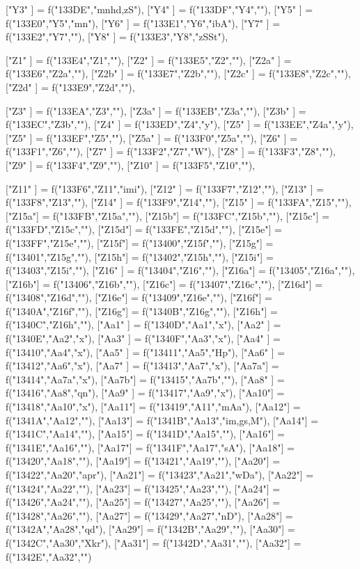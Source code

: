 {["Y3"  ]    = f("133DE","mnhd,zS"),
  ["Y4"  ]    = f("133DF","Y4",""),
["Y5"  ]    = f("133E0","Y5","mn"),
["Y6"  ]    = f("133E1","Y6","ibA"),
  ["Y7"  ]    = f("133E2","Y7",""),
["Y8"  ]    = f("133E3","Y8","zSSt"),

  ["Z1"  ]    = f("133E4","Z1",""),
  ["Z2"  ]    = f("133E5","Z2",""),
  ["Z2a" ]    = f("133E6","Z2a",""),
  ["Z2b" ]    = f("133E7","Z2b",""),
["Z2c" ]    = f("133E8","Z2c",""),
["Z2d" ]    = f("133E9","Z2d",""),

  ["Z3"  ]    = f("133EA","Z3",""),
  ["Z3a" ]    = f("133EB","Z3a",""),
["Z3b" ]    = f("133EC","Z3b",""),
["Z4"  ]    = f("133ED","Z4","y"),
["Z5"  ]    = f("133EE","Z4a","y"),
  ["Z5"  ]    = f("133EF","Z5",""),
  ["Z5a" ]    = f("133F0","Z5a",""),
  ["Z6"  ]    = f("133F1","Z6",""),
["Z7"  ]    = f("133F2","Z7","W"),
  ["Z8"  ]    = f("133F3","Z8",""),
  ["Z9"  ]    = f("133F4","Z9",""),
  ["Z10" ]    = f("133F5","Z10",""),

["Z11" ]    = f("133F6","Z11","imi"),
  ["Z12" ]    = f("133F7","Z12",""),
  ["Z13" ]    = f("133F8","Z13",""),
  ["Z14" ]    = f("133F9","Z14",""),
  ["Z15" ]    = f("133FA","Z15",""),
  ["Z15a"]    = f("133FB","Z15a",""),
  ["Z15b"]    = f("133FC","Z15b",""),
  ["Z15c"]    = f("133FD","Z15c",""),
  ["Z15d"]    = f("133FE","Z15d",""),
  ["Z15e"]    = f("133FF","Z15e",""),
  ["Z15f"]    = f("13400","Z15f",""),
  ["Z15g"]    = f("13401","Z15g",""),
  ["Z15h"]    = f("13402","Z15h",""),
["Z15i"]    = f("13403","Z15i",""),
  ["Z16" ]    = f("13404","Z16",""),
  ["Z16a"]    = f("13405","Z16a",""),
  ["Z16b"]    = f("13406","Z16b",""),
  ["Z16c"]    = f("13407","Z16c",""),
  ["Z16d"]    = f("13408","Z16d",""),
  ["Z16e"]    = f("13409","Z16e",""),
  ["Z16f"]    = f("1340A","Z16f",""),
  ["Z16g"]  = f("1340B","Z16g",""),
  ["Z16h"]  = f("1340C","Z16h",""),
["Aa1" ]  = f("1340D","Aa1","x"),
    ["Aa2" ]    = f("1340E","Aa2","x"),
["Aa3" ]    = f("1340F","Aa3","x"),
["Aa4" ]    = f("13410","Aa4","x"),
["Aa5" ]    = f("13411","Aa5","Hp"),
["Aa6" ]    = f("13412","Aa6","x"),
["Aa7" ]    = f("13413","Aa7","x"),
["Aa7a"]    = f("13414","Aa7a","x"),
["Aa7b"]    = f("13415","Aa7b",""),
["Aa8" ]    = f("13416","Aa8","qn"),
["Aa9" ]    = f("13417","Aa9","x"),
["Aa10"]    = f("13418","Aa10","x"),
["Aa11"]    = f("13419","A11","mAa"),
["Aa12"]    = f("1341A","Aa12",""),
["Aa13"]    = f("1341B","Aa13","im,gs,M"),
["Aa14"]    = f("1341C","Aa14",""),
["Aa15"]    = f("1341D","Aa15",""),
["Aa16"]    = f("1341E","Aa16",""),
["Aa17"]    = f("1341F","Aa17","sA"),
["Aa18"]    = f("13420","Aa18",""),
["Aa19"]    = f("13421","Aa19",""),
["Aa20"]    = f("13422","Aa20","apr"),
["Aa21"]    = f("13423","Aa21","wDa"),
["Aa22"]    = f("13424","Aa22",""),
["Aa23"]    = f("13425","Aa23",""),
["Aa24"]    = f("13426","Aa24",""),
["Aa25"]    = f("13427","Aa25",""),
["Aa26"]    = f("13428","Aa26",""),
["Aa27"]    = f("13429","Aa27","nD"),
["Aa28"]    = f("1342A","Aa28","qd"),
["Aa29"]    = f("1342B","Aa29",""),
      ["Aa30"]    = f("1342C","Aa30","Xkr"),
["Aa31"]    = f("1342D","Aa31",""),
["Aa32"]    = f("1342E","Aa32","")
}

